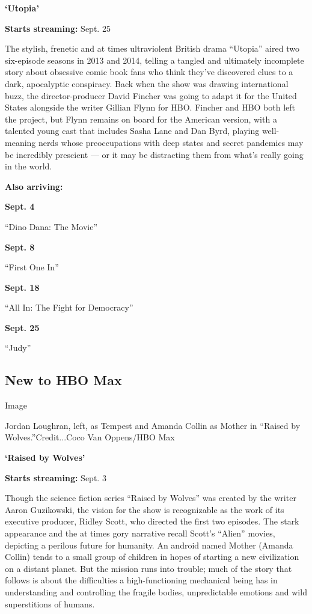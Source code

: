 \textbf{`Utopia'}

\textbf{Starts streaming:} Sept. 25

The stylish, frenetic and at times ultraviolent British drama ``Utopia''
aired two six-episode seasons in 2013 and 2014, telling a tangled and
ultimately incomplete story about obsessive comic book fans who think
they've discovered clues to a dark, apocalyptic conspiracy. Back when
the show was drawing international buzz, the director-producer David
Fincher was going to adapt it for the United States alongside the writer
Gillian Flynn for HBO. Fincher and HBO both left the project, but Flynn
remains on board for the American version, with a talented young cast
that includes Sasha Lane and Dan Byrd, playing well-meaning nerds whose
preoccupations with deep states and secret pandemics may be incredibly
prescient --- or it may be distracting them from what's really going in
the world.

\textbf{Also arriving:}

\textbf{Sept. 4}

``Dino Dana: The Movie''

\textbf{Sept. 8}

``First One In''

\textbf{Sept. 18}

``All In: The Fight for Democracy''

\textbf{Sept. 25}

``Judy''

\hypertarget{new-to-hbo-max}{%
\subsection{New to HBO Max}\label{new-to-hbo-max}}

Image

Jordan Loughran, left, as Tempest and Amanda Collin as Mother in
``Raised by Wolves.''Credit...Coco Van Oppens/HBO Max

\textbf{`Raised by Wolves'}

\textbf{Starts streaming:} Sept. 3

Though the science fiction series ``Raised by Wolves'' was created by
the writer Aaron Guzikowski, the vision for the show is recognizable as
the work of its executive producer, Ridley Scott, who directed the first
two episodes. The stark appearance and the at times gory narrative
recall Scott's ``Alien'' movies, depicting a perilous future for
humanity. An android named Mother (Amanda Collin) tends to a small group
of children in hopes of starting a new civilization on a distant planet.
But the mission runs into trouble; much of the story that follows is
about the difficulties a high-functioning mechanical being has in
understanding and controlling the fragile bodies, unpredictable emotions
and wild superstitions of humans.

